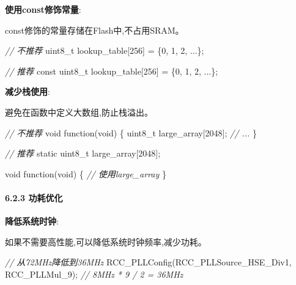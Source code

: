 \documentclass[
]{article}
\newenvironment{Shaded}{}{}
\newcommand{\CommentTok}[1]{\textcolor[rgb]{0.38,0.63,0.69}{\textit{#1}}}
\newcommand{\DataTypeTok}[1]{\textcolor[rgb]{0.56,0.13,0.00}{#1}}
\newcommand{\DecValTok}[1]{\textcolor[rgb]{0.25,0.63,0.44}{#1}}
\newcommand{\NormalTok}[1]{#1}
\begin{document}
\textbf{使用const修饰常量}:

const修饰的常量存储在Flash中,不占用SRAM。

\begin{Shaded}
\begin{Highlighting}[]
\CommentTok{// 不推荐}
\DataTypeTok{uint8\_t}\NormalTok{ lookup\_table[}\DecValTok{256}\NormalTok{] = \{}\DecValTok{0}\NormalTok{, }\DecValTok{1}\NormalTok{, }\DecValTok{2}\NormalTok{, ...\};}

\CommentTok{// 推荐}
\DataTypeTok{const} \DataTypeTok{uint8\_t}\NormalTok{ lookup\_table[}\DecValTok{256}\NormalTok{] = \{}\DecValTok{0}\NormalTok{, }\DecValTok{1}\NormalTok{, }\DecValTok{2}\NormalTok{, ...\};}
\end{Highlighting}
\end{Shaded}

\textbf{减少栈使用}:

避免在函数中定义大数组,防止栈溢出。

\begin{Shaded}
\begin{Highlighting}[]
\CommentTok{// 不推荐}
\DataTypeTok{void}\NormalTok{ function(}\DataTypeTok{void}\NormalTok{)}
\NormalTok{\{}
    \DataTypeTok{uint8\_t}\NormalTok{ large\_array[}\DecValTok{2048}\NormalTok{];}
    \CommentTok{// ...}
\NormalTok{\}}

\CommentTok{// 推荐}
\DataTypeTok{static} \DataTypeTok{uint8\_t}\NormalTok{ large\_array[}\DecValTok{2048}\NormalTok{];}

\DataTypeTok{void}\NormalTok{ function(}\DataTypeTok{void}\NormalTok{)}
\NormalTok{\{}
    \CommentTok{// 使用large\_array}
\NormalTok{\}}
\end{Highlighting}
\end{Shaded}

\hypertarget{ux529fux8017ux4f18ux5316}{%
\paragraph{6.2.3 功耗优化}\label{ux529fux8017ux4f18ux5316}}

\textbf{降低系统时钟}:

如果不需要高性能,可以降低系统时钟频率,减少功耗。

\begin{Shaded}
\begin{Highlighting}[]
\CommentTok{// 从72MHz降低到36MHz}
\NormalTok{RCC\_PLLConfig(RCC\_PLLSource\_HSE\_Div1, RCC\_PLLMul\_9);  }\CommentTok{// 8MHz * 9 / 2 = 36MHz}
\end{Highlighting}
\end{Shaded}
\end{document}
